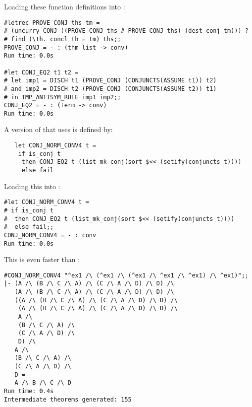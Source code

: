 \noindent Loading these \ML{} function definitions into \HOL:

\begin{session}\begin{verbatim}
#letrec PROVE_CONJ ths tm =
# (uncurry CONJ ((PROVE_CONJ ths # PROVE_CONJ ths) (dest_conj tm))) ?
# find (\th. concl th = tm) ths;;
PROVE_CONJ = - : (thm list -> conv)
Run time: 0.0s

#let CONJ_EQ2 t1 t2 =
# let imp1 = DISCH t1 (PROVE_CONJ (CONJUNCTS(ASSUME t1)) t2)
# and imp2 = DISCH t2 (PROVE_CONJ (CONJUNCTS(ASSUME t2)) t1)
# in IMP_ANTISYM_RULE imp1 imp2;;
CONJ_EQ2 = - : (term -> conv)
Run time: 0.0s
\end{verbatim}\end{session}


\noindent A version of  that
uses  is defined by:

\begin{hol}\begin{verbatim}
   let CONJ_NORM_CONV4 t =
    if is_conj t
     then CONJ_EQ2 t (list_mk_conj(sort $<< (setify(conjuncts t))))
     else fail
\end{verbatim}\end{hol}


\noindent Loading this into \ML:

\begin{session}\begin{verbatim}
#let CONJ_NORM_CONV4 t =
# if is_conj t
#  then CONJ_EQ2 t (list_mk_conj(sort $<< (setify(conjuncts t))))
#  else fail;;
CONJ_NORM_CONV4 = - : conv
Run time: 0.0s
\end{verbatim}\end{session}

\noindent This is even faster than :

\begin{session}\begin{verbatim}
#CONJ_NORM_CONV4 "^ex1 /\ (^ex1 /\ (^ex1 /\ ^ex1 /\ ^ex1) /\ ^ex1)";;
|- (A /\ (B /\ C /\ A) /\ (C /\ A /\ D) /\ D) /\
   (A /\ (B /\ C /\ A) /\ (C /\ A /\ D) /\ D) /\
   ((A /\ (B /\ C /\ A) /\ (C /\ A /\ D) /\ D) /\
    (A /\ (B /\ C /\ A) /\ (C /\ A /\ D) /\ D) /\
    A /\
    (B /\ C /\ A) /\
    (C /\ A /\ D) /\
    D) /\
   A /\
   (B /\ C /\ A) /\
   (C /\ A /\ D) /\
   D =
   A /\ B /\ C /\ D
Run time: 0.4s
Intermediate theorems generated: 155
\end{verbatim}\end{session}

